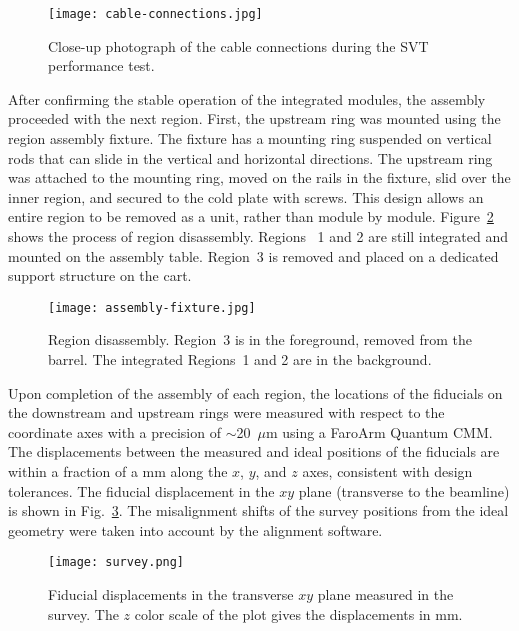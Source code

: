 \begin{figure}[h] 
\centering 
\texttt{[image: cable-connections.jpg]}
\caption{Close-up photograph of the cable connections during the SVT performance test.}
\label{fig:cable-connections}
\end{figure}
 
After confirming the stable operation of the integrated modules, the assembly proceeded with the next region. First,
the upstream ring was mounted using the region assembly fixture. The fixture has a mounting ring suspended on
vertical rods that can slide in the vertical and horizontal directions. The upstream ring was attached to the mounting
ring, moved on the rails in the fixture, slid over the inner region, and secured to the cold plate with screws. This
design allows an entire region to be removed as a unit, rather than module by module.
Figure~\ref{fig:assembly-fixture} shows the process of region disassembly. Regions~ 1 and 2 are still integrated
and mounted on the assembly table. Region~3 is removed and placed on a dedicated support structure on the cart.

\begin{figure}[h] 
\centering 
\texttt{[image: assembly-fixture.jpg]}
\caption{Region disassembly. Region~3 is in the foreground, removed from the barrel. The integrated Regions~1 and
  2 are in the background.}
\label{fig:assembly-fixture}
\end{figure}

Upon completion of the assembly of each region, the locations of the fiducials on the downstream and upstream rings
were measured with respect to the coordinate axes with a precision of $\sim$20~$\mu$m using a FaroArm Quantum
CMM. The displacements between the measured and ideal positions of the fiducials are within a fraction of a mm
along the $x$, $y$, and $z$ axes, consistent with design tolerances. The fiducial displacement in the $xy$ plane
(transverse to the beamline) is shown in Fig.~\ref{fig:survey}. The misalignment shifts of the survey positions from
the ideal geometry were taken into account by the alignment software. 

\begin{figure}[h]
\centering 
\texttt{[image: survey.png]}
\caption{Fiducial displacements in the transverse $xy$ plane measured in the survey. The $z$ color scale of the
plot gives the displacements in mm.}
\label{fig:survey}
\end{figure}

